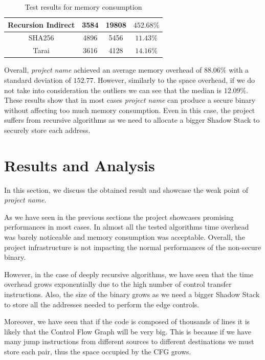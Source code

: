\begin{table}
\begin{tabular}{|c|c|c|c|}
    \hline
    Recursion Indirect          & 3584                         & 19808                        & $452.68\%$               \\
    \hline
    SHA256                      & 4896                         & 5456                         & $11.43\%$                \\
    \hline
    Tarai                       & 3616                         & 4128                         & $14.16\%$                \\
    \hline
  \end{tabular}
  \caption{Test results for memory consumption}
  \label{tab:binsize}
\end{table}

Overall, \textit{project name} achieved an average memory overhead of $88.06\%$
with a standard deviation of $152.77$. However, similarly to the space overhead,
if we do not take into consideration the outliers we can see that the median is $1
2.09\%$. These results show that in most cases \textit{project name} can produce
a secure binary without affecting too much memory consumption. Even in this case,
the project suffers from recursive algorithms as we need to allocate a bigger Shadow
Stack to securely store each address.

\section{Results and Analysis}
\label{sec:pa_results}

In this section, we discuss the obtained result and showcase the weak point of \textit{project
name}.

As we have seen in the previous sections the project showcases promising
performances in most cases. In almost all the tested algorithms time overhead was
barely noticeable and memory consumption was acceptable. Overall, the project infrastructure
is not impacting the normal performances of the non-secure binary.

However, in the case of deeply recursive algorithms, we have seen that the time overhead
grows exponentially due to the high number of control transfer instructions.
Also, the size of the binary grows as we need a bigger Shadow Stack to store all
the addresses needed to perform the edge controls.

Moreover, we have seen that if the code is composed of thousands of lines it is
likely that the Control Flow Graph will be very big. This is because if we have many
jump instructions from different sources to different destinations we must store
each pair, thus the space occupied by the CFG grows.

